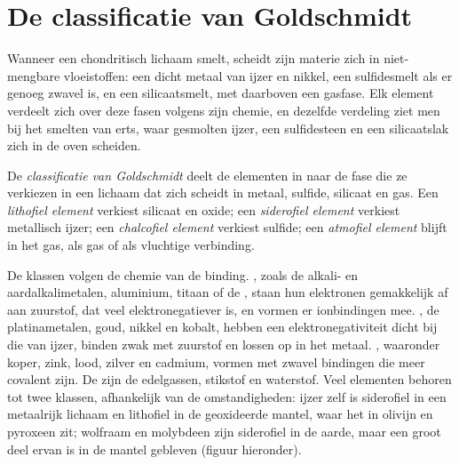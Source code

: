 \section{De classificatie van Goldschmidt}

Wanneer een chondritisch lichaam smelt, scheidt zijn materie zich in niet-mengbare vloeistoffen: een
dicht metaal van ijzer en nikkel, een sulfidesmelt als er genoeg zwavel is, en een
silicaatsmelt, met daarboven een gasfase. Elk element verdeelt zich over
deze fasen volgens zijn chemie, en dezelfde verdeling ziet men bij het
smelten van erts, waar gesmolten ijzer, een sulfidesteen en een silicaatslak zich in de
oven scheiden.

\begin{definition}
\label{def:b2:elements-in-the-earth:goldschmidt}
De \emph{classificatie van Goldschmidt} deelt
de elementen in naar de fase die ze verkiezen in een lichaam dat zich scheidt in metaal,
sulfide, silicaat en gas. Een \emph{lithofiel element}
verkiest silicaat en oxide; een \emph{siderofiel element} verkiest metallisch ijzer; een \emph{chalcofiel
element} verkiest sulfide; een \emph{atmofiel
element} blijft in het gas, als gas of als vluchtige
verbinding.
\end{definition}

De klassen volgen de chemie van de binding. , zoals de
alkali- en aardalkalimetalen, aluminium, titaan of de , staan
hun elektronen gemakkelijk af aan zuurstof, dat veel elektronegatiever is, en
vormen er ionbindingen mee. , de platinametalen, goud,
nikkel en kobalt, hebben een elektronegativiteit dicht bij die van ijzer, binden zwak
met zuurstof en lossen op in het metaal. , waaronder koper, zink, lood,
zilver en cadmium, vormen met zwavel bindingen die meer covalent zijn.
De  zijn de edelgassen, stikstof en waterstof. Veel
elementen behoren tot twee klassen, afhankelijk van de omstandigheden: ijzer zelf is
siderofiel in een metaalrijk lichaam en lithofiel in de geoxideerde mantel, waar het
in olivijn en pyroxeen zit; wolfraam en molybdeen zijn siderofiel in de
aarde, maar een groot deel ervan is in de mantel gebleven (figuur hieronder).

